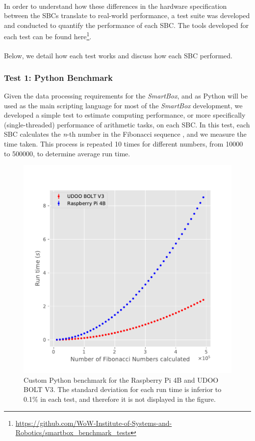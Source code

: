 \paragraph{} In order to understand how these differences in the hardware specification between the \acs{SBC}s translate to real-world performance, a test suite was developed and conducted to quantify the performance of each \acs{SBC}. The tools developed for each test can be found here\footnote{\url{https://github.com/WoW-Institute-of-Systems-and-Robotics/smartbox\_benchmark\_tests}}. 

\paragraph{}Below, we detail how each test works and discuss how each \acs{SBC} performed. 

\subsubsection{Test 1: Python Benchmark}

Given the data processing requirements for the \textit{SmartBox}, and as Python will be used as the main scripting language for most of the \textit{SmartBox} development, we developed a simple test to estimate computing performance, or more specifically (single-threaded) performance of arithmetic tasks, on each \acs{SBC}. In this test, each \acs{SBC} calculates the \textit{n}-th number in the Fibonacci sequence \cite{pierce1951fibonacci}, and we measure the time taken. This process is repeated 10 times for different numbers, from 10000 to 500000, to determine average run time.

\begin{figure}[H]
    \centering
    \includegraphics[width=0.8 \linewidth]{images/fibonacci-test.pdf}
    \caption [Custom Python benchmark for the Raspberry Pi 4B and UDOO BOLT V3.]{ Custom Python benchmark for the Raspberry Pi 4B and UDOO BOLT V3. The standard deviation for each run time is inferior to 0.1\% in each test, and therefore it is not displayed in the figure.}
    \label{fig:fibonacci-tests}
\end{figure}

